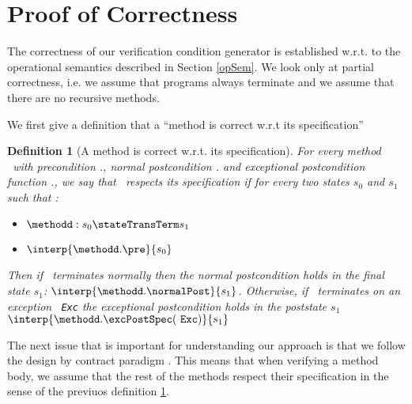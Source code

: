 \newtheorem{defCorrect}{Definition}[section]
\newtheorem{lemma0}{Lemma}[section] %
\newtheorem{lemma1}[lemma0]{Lemma} %
\newtheorem{lemma3}[lemma0]{Lemma} %
\newtheorem{lemma2}[lemma0]{Lemma} %
\newtheorem{vcGenCorrect}[lemma0]{Theorem}

\newcommand{\state}[1]{ \tau_{#1} } 
\newcommand{\straightBraces}[1]{ \texttt{ (} #1 \texttt{ )} }
\newcommand{\tbc}{\textit{TBC}}


\section{Proof of Correctness } \label{proof}

The correctness of our verification  condition generator is established w.r.t.
to the operational semantics described in Section \ref{opSem}. We look only at
 partial correctness, i.e. we assume that programs always terminate and we assume that there are no recursive methods.

We first give a definition that a ``method is correct w.r.t its specification''

\begin{defCorrect}[A method is correct w.r.t. its specification] \label{defCorrect}
For every method \methodd \ with precondition \methodd.\pre, normal postcondition \methodd.\normalPost
and exceptional postcondition function \methodd.\excPostSpec, we say that \methodd \ respects its specification if 
for every two states $s_0$ and $s_1$ such that :
\begin{itemize}
      \item   $\methodd : s_0  \stateTransTerm s_1   $
      \item   $ \interp{\methodd.\pre }{ s_0 }$
\end{itemize}
Then if \methodd \ terminates normally then the normal postcondition holds in the final state $s_1 $:  $\interp{\methodd.\normalPost}{s_1}$. 
Otherwise, if  \methodd \ terminates on an exception \mbox{ \rm \texttt{Exc}} the exceptional postcondition holds in the poststate $s_1 $
$ \interp{\methodd.\excPostSpec(  \mbox{ \rm \texttt{Exc}} )}{s_1} $
\end{defCorrect}
 
 The next issue that is important for understanding our approach is that we follow the design by 
 contract paradigm \cite{M97oos}. This means that when verifying a method body, we assume that the
 rest of the methods respect their
 specification in the sense of the previuos definition \ref{defCorrect}.


